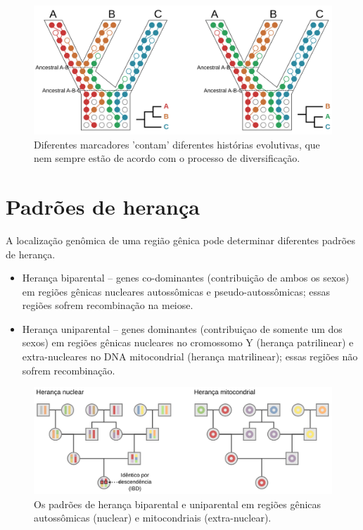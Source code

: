 \documentclass[
]{book}
\begin{document}
\begin{figure}

{\centering \includegraphics[width=800px]{figs/genealogy_conflict} 

}

\caption{Diferentes marcadores 'contam' diferentes histórias evolutivas, que nem sempre estão de acordo com o processo de diversificação.}\label{fig:geneconflito}
\end{figure}

\hypertarget{padruxf5es-de-heranuxe7a}{%
\section{Padrões de herança}\label{padruxf5es-de-heranuxe7a}}

A localização genômica de uma região gênica pode determinar diferentes padrões de herança.

\begin{itemize}
\item
  Herança biparental -- genes co-dominantes (contribuição de ambos os sexos) em regiões gênicas nucleares autossômicas e pseudo-autossômicas; essas regiões sofrem recombinação na meiose.
\item
  Herança uniparental -- genes dominantes (contribuiçao de somente um dos sexos) em regiões gênicas nucleares no cromossomo Y (herança patrilinear) e extra-nucleares no DNA mitocondrial (herança matrilinear); essas regiões não sofrem recombinação.
\end{itemize}

\begin{figure}

{\centering \includegraphics[width=800px]{figs/inheritance_types_genealogy} 

}

\caption{Os padrões de herança biparental e uniparental em regiões gênicas autossômicas (nuclear) e mitocondriais (extra-nuclear).}\label{fig:tiposheranca}
\end{figure}
\end{document}
